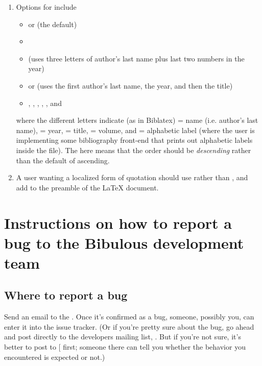 \documentclass[letterpaper,10pt,english]{sphinxmanual}
\begin{document}
\begin{enumerate}
\item {} 
Options for  include
\begin{itemize}
\item {} 
 or  (the default)

\item {} 

\item {} 
 (uses three letters of author's last name plus last two numbers in the year)

\item {} 
 or  (uses the first author's last name, the year, and then the title)

\item {} 
, , , , , and 

\end{itemize}

where the different letters indicate (as in Biblatex)  = name (i.e. author's last name),  = year,  = title,  = volume, and  = alphabetic label (where the user is implementing some bibliography front-end that prints out alphabetic labels inside the  file). The  here means that the order should be \emph{descending} rather than the default of ascending.

\item {} 
A user wanting a localized form of quotation should use  rather than , and add  to the preamble of the LaTeX document.

\end{enumerate}


\chapter{Instructions on how to report a bug to the Bibulous development team}
\label{instructions_for_reporting_bugs:instructions-on-how-to-report-a-bug-to-the-bibulous-development-team}\label{instructions_for_reporting_bugs::doc}

\section{Where to report a bug}
\label{instructions_for_reporting_bugs:where-to-report-a-bug}
Send an email to the . Once it's confirmed as a bug, someone, possibly you, can enter it into the issue tracker. (Or if you're pretty sure about the bug, go ahead and post directly to the developers mailing list, . But if you're not sure, it's better to post to {[}\code{users mailing list}{]} first; someone there can tell you whether the behavior you encountered is expected or not.)
\end{document}
